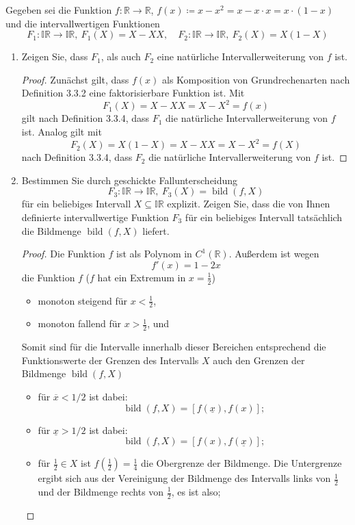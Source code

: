\documentclass[12pt]{extreport} %
\newcommand{\R}{\mathbb{R}}
\theoremstyle{named}
\theoremstyle{nnamed}
\theoremstyle{itshape}
\theoremstyle{normal}
\begin{document}
Gegeben sei die Funktion $f \colon \R \rightarrow \R$, $f(x) \coloneqq x - x^2 = x - x \cdot x = x \cdot \left( 1 - x \right)$ und die intervallwertigen Funktionen
	$$ F_1 \colon \mathbb{IR} \rightarrow \mathbb{IR}, ~ F_1(X) = X - X X, \quad F_2 \colon \mathbb{IR} \rightarrow \mathbb{IR}, ~ F_2(X) = X(1- X) $$
\begin{enumerate}
	\item Zeigen Sie, dass $F_1$, als auch $F_2$ eine natürliche Intervallerweiterung von $f$ ist.
		\begin{proof} 
			Zunächst gilt, dass $f(x)$ als Komposition von Grundrechenarten nach Definition 3.3.2 eine faktorisierbare Funktion ist. Mit 
			$$ F_1(X) = X-XX = X-X^2 = f(x) $$
			gilt nach Definition 3.3.4, dass $F_1$ die natürliche Intervallerweiterung von $f$ ist. Analog gilt mit 
			$$ F_2(X)=X(1-X)=X-XX=X-X^2=f(X) $$
			nach Definition 3.3.4, dass $F_2$ die natürliche Intervallerweiterung von $f$ ist.
		\end{proof}
	\item Bestimmen Sie durch geschickte Fallunterscheidung
		$$ F_3 \colon \mathbb{IR} \rightarrow \mathbb{IR}, ~ F_3(X) = \operatorname{bild}(f, X) $$
		für ein beliebiges Intervall $X \subseteq \mathbb{IR}$ explizit. Zeigen Sie, dass die von Ihnen definierte intervallwertige Funktion $F_3$ für ein beliebiges Intervall tatsächlich die Bildmenge $\operatorname{bild}(f, X)$ liefert.
		\begin{proof}
			Die Funktion $f$ ist als Polynom in $C^1(\R)$. Außerdem ist wegen 
				$$ f'(x) = 1 - 2x $$ 
			die Funktion $f$ ($f$ hat ein Extremum in $x = \frac{1}{2}$)
			\begin{itemize}
				\item monoton steigend für $x < \frac{1}{2}$, 
				\item monoton fallend für $x > \frac{1}{2}$, und
			\end{itemize}
			Somit sind für die Intervalle innerhalb dieser Bereichen entsprechend die Funktionswerte der Grenzen des Intervalls $X$ auch den Grenzen der Bildmenge $\operatorname{bild}(f,X)$
			\begin{itemize}
				\item für $\overline{x} < 1/2$ ist dabei:
					$$ \operatorname{bild}(f,X) = \left[f(\underline{x}), f(x) \right]; $$
				\item für $\underline{x} >1/2$ ist dabei:
					$$ \operatorname{bild}(f,X) = \left[f(x), f(\underline{x})\right]; $$
				\item für $\frac{1}{2} \in X$ ist $f \left( \frac{1}{2} \right) = \frac{1}{4}$ die Obergrenze der Bildmenge. Die Untergrenze ergibt sich aus der Vereinigung der Bildmenge des Intervalls links von $\frac{1}{2}$ und der Bildmenge rechts von $\frac{1}{2}$, es ist also;

\end{itemize}
\end{proof}
\end{enumerate}
\end{document}
